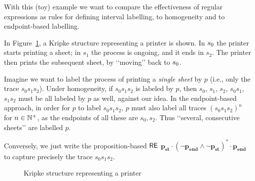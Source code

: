 \begin{example}
With this (toy) example we want to compare the effectiveness of regular expressions as rules for defining interval labelling, to homogeneity and to endpoint-based labelling.

In Figure~\ref{fig:printing}, a Kripke structure representing a printer is shown.
In $s_0$ the printer starts printing a sheet; in $s_1$ the process is ongoing, and it ends in $s_2$. The printer then prints the subsequent sheet, by \lq\lq moving\rq\rq{} back to $s_0$.

Imagine we want to label the process of printing a \emph{single sheet} by $p$ (i.e., only the trace $s_0s_1s_2$).
Under homogeneity, if $s_0s_1s_2$ is labeled by $p$, then $s_0$, $s_1$, $s_2$, $s_0s_1$, $s_1s_2$ must be all labeled by $p$ as well, against our idea.
In the endpoint-based approach, in order for $p$ to label $s_0s_1s_2$, $p$ must also label all traces $(s_0s_1s_2)^n$ for $n\in \mathbb{N}^+$, as the endpoints of all these are $s_0,s_2$. Thus \lq\lq several, consecutive sheets\rq\rq{} are labelled $p$.

Conversely, we just write the proposition-based $\mathsf{RE}$ $\mathbf{p_\text{st}} \cdot ( \mathbf{\neg p_\text{end}\wedge \neg p_\text{st}})^* \cdot \mathbf{p_\text{end}}$ to capture precisely the trace $s_0s_1s_2$.

\begin{figure}[H]
    \centering
    \caption{Kripke structure representing a printer}
    \label{fig:printing}
\end{figure}
\end{example}
